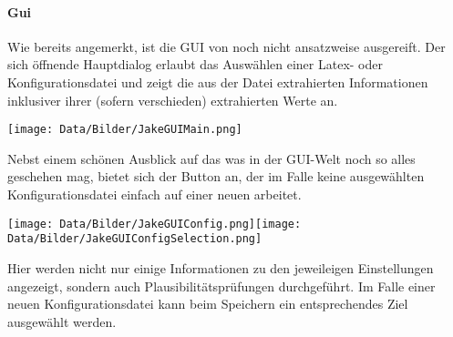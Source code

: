 \paragraph{Gui}
Wie bereits angemerkt, ist die GUI von \Jake noch nicht ansatzweise ausgereift. Der sich öffnende Hauptdialog erlaubt das Auswählen einer Latex- oder Konfigurationsdatei und zeigt die aus der Datei extrahierten Informationen inklusiver ihrer (sofern verschieden) extrahierten Werte an.
\iflillycompact\else%
\begin{center}
    \texttt{[image: Data/Bilder/JakeGUIMain.png]}
\end{center}
\fi%
Nebst einem schönen Ausblick auf das was in der GUI-Welt noch so alles geschehen mag, bietet sich der Button  an, der im Falle keine ausgewählten Konfigurationsdatei einfach auf einer neuen arbeitet.
\iflillycompact\else%
\begin{center}
    \texttt{[image: Data/Bilder/JakeGUIConfig.png]}\texttt{[image: Data/Bilder/JakeGUIConfigSelection.png]}
\end{center}
\fi%
Hier werden nicht nur einige Informationen zu den jeweileigen Einstellungen angezeigt, sondern auch Plausibilitätsprüfungen durchgeführt. Im Falle einer neuen Konfigurationsdatei kann beim Speichern ein entsprechendes Ziel ausgewählt werden.

